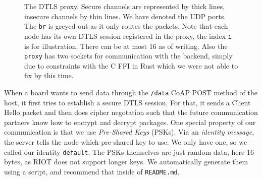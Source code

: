 \documentclass[acmtog, language=english, nonacm]{acmart}
\begin{document}
    \begin{figure}[!hbtp]
        \centering
        \caption{The DTLS proxy. Secure channels are represented by thick lines, insecure channels by thin lines. We have denoted the UDP ports. The \texttt{br} is greyed out as it only routes the packets. Note that each node has its own DTLS session registered in the proxy, the index \texttt{i} is for illustration. There can be at most 16 as of writing. Also the \texttt{proxy} has two sockets for communication with the backend, simply due to constraints with the C FFI in Rust which we were not able to fix by this time.}
        \label{fig:dtls_proxy}
    \end{figure}

    When a board wants to send data through the \texttt{/data} CoAP POST method of the host, it first tries to establish a secure DTLS session. For that, it sends a Client Hello packet and then does cipher negotation such that the future communication partners know how to encrypt and decrypt packages. One special property of our communication is that we use \emph{Pre-Shared Keys} (PSKs). Via an \emph{identity message}, the server tells the node which pre-shared key to use. We only have one, so we called our identity \texttt{default}. The PSKs themselves are just random data, here 16 bytes, as RIOT does not support longer keys. We automatically generate them using a script, and recommend that inside of \texttt{README.md}.
\end{document}
